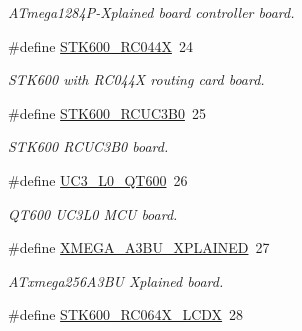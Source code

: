 \begin{DoxyCompactItemize}
\begin{DoxyCompactList}\small\item\em A\+Tmega1284\+P-\/\+Xplained board controller board. \end{DoxyCompactList}\item 
\hypertarget{group__group__common__boards_ga53054d452a89f550fcdff65adc167f88}{}\#define \hyperlink{group__group__common__boards_ga53054d452a89f550fcdff65adc167f88}{S\+T\+K600\+\_\+\+R\+C044\+X}~24\label{group__group__common__boards_ga53054d452a89f550fcdff65adc167f88}

\begin{DoxyCompactList}\small\item\em S\+T\+K600 with R\+C044\+X routing card board. \end{DoxyCompactList}\item 
\hypertarget{group__group__common__boards_ga6bdfe50597188fd8a4956c247ecf9fa9}{}\#define \hyperlink{group__group__common__boards_ga6bdfe50597188fd8a4956c247ecf9fa9}{S\+T\+K600\+\_\+\+R\+C\+U\+C3\+B0}~25\label{group__group__common__boards_ga6bdfe50597188fd8a4956c247ecf9fa9}

\begin{DoxyCompactList}\small\item\em S\+T\+K600 R\+C\+U\+C3\+B0 board. \end{DoxyCompactList}\item 
\hypertarget{group__group__common__boards_gae06980d7c2c8a89eab699394bfb52897}{}\#define \hyperlink{group__group__common__boards_gae06980d7c2c8a89eab699394bfb52897}{U\+C3\+\_\+\+L0\+\_\+\+Q\+T600}~26\label{group__group__common__boards_gae06980d7c2c8a89eab699394bfb52897}

\begin{DoxyCompactList}\small\item\em Q\+T600 U\+C3\+L0 M\+C\+U board. \end{DoxyCompactList}\item 
\hypertarget{group__group__common__boards_ga6bc10dae84bde15597ba87e803e6f476}{}\#define \hyperlink{group__group__common__boards_ga6bc10dae84bde15597ba87e803e6f476}{X\+M\+E\+G\+A\+\_\+\+A3\+B\+U\+\_\+\+X\+P\+L\+A\+I\+N\+E\+D}~27\label{group__group__common__boards_ga6bc10dae84bde15597ba87e803e6f476}

\begin{DoxyCompactList}\small\item\em A\+Txmega256\+A3\+B\+U Xplained board. \end{DoxyCompactList}\item 
\hypertarget{group__group__common__boards_gae7749288a3bd2be20b0283233af4df79}{}\#define \hyperlink{group__group__common__boards_gae7749288a3bd2be20b0283233af4df79}{S\+T\+K600\+\_\+\+R\+C064\+X\+\_\+\+L\+C\+D\+X}~28\label{group__group__common__boards_gae7749288a3bd2be20b0283233af4df79}


\end{DoxyCompactItemize}
